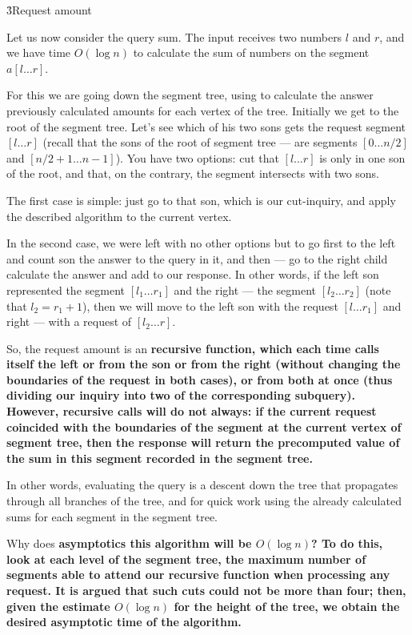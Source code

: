 \h3{Request amount}

Let us now consider the query sum. The input receives two numbers $l$ and $r$, and we have time $O (\log n)$ to calculate the sum of numbers on the segment $a[l \ldots r]$.

For this we are going down the segment tree, using to calculate the answer previously calculated amounts for each vertex of the tree. Initially we get to the root of the segment tree. Let's see which of his two sons gets the request segment $[l \ldots r]$ (recall that the sons of the root of segment tree --- are segments $[0 \ldots n/2]$ and $[n/2+1 \ldots n-1]$). You have two options: cut that $[l \ldots r]$ is only in one son of the root, and that, on the contrary, the segment intersects with two sons.

The first case is simple: just go to that son, which is our cut-inquiry, and apply the described algorithm to the current vertex.

In the second case, we were left with no other options but to go first to the left and count son the answer to the query in it, and then --- go to the right child calculate the answer and add to our response. In other words, if the left son represented the segment $[l_1 \ldots r_1]$ and the right --- the segment $[l_2 \ldots r_2]$ (note that $l_2 = r_1 + 1$), then we will move to the left son with the request $[l \ldots r_1]$ and right --- with a request of $[l_2 \ldots r]$.

So, the request amount is an \bf{recursive function}, which each time calls itself the left or from the son or from the right (without changing the boundaries of the request in both cases), or from both at once (thus dividing our inquiry into two of the corresponding subquery). However, recursive calls will do not always: if the current request coincided with the boundaries of the segment at the current vertex of segment tree, then the response will return the precomputed value of the sum in this segment recorded in the segment tree.

In other words, evaluating the query is a descent down the tree that propagates through all branches of the tree, and for quick work using the already calculated sums for each segment in the segment tree.

Why does \bf{asymptotics} this algorithm will be $O (\log n)$? To do this, look at each level of the segment tree, the maximum number of segments able to attend our recursive function when processing any request. It is argued that such cuts could not be more than four; then, given the estimate $O (\log n)$ for the height of the tree, we obtain the desired asymptotic time of the algorithm.

